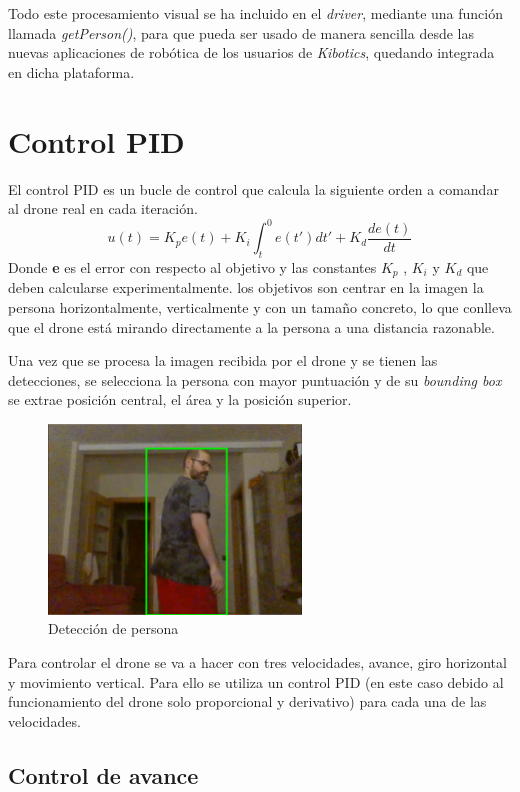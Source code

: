 Todo este procesamiento visual se ha incluido en el \textit{driver}, mediante una función llamada \textit{getPerson()}, para que pueda ser usado de manera sencilla desde las nuevas aplicaciones de robótica de los usuarios de \textit{Kibotics}, quedando integrada en dicha plataforma.

\section{Control PID}
El control PID es un bucle de control que calcula la siguiente orden a comandar al drone real en cada iteración.
\[ u(t) = K_p e(t) + K_i \int_{t}^{0} e(t') dt' + K_d \frac{de(t)}{dt}\]
Donde \textbf{e} es el error con respecto al objetivo y las  constantes $K_p$ , $K_i$ y $K_d$ que deben calcularse experimentalmente. los objetivos son centrar en la imagen la persona horizontalmente, verticalmente y con un tamaño concreto, lo que conlleva que el drone está mirando directamente a la persona a una distancia razonable.

Una vez que se procesa la imagen recibida por el drone y se tienen las detecciones, se selecciona la persona con mayor puntuación y de su \textit{bounding box} se extrae posición central, el área y la posición superior.

\begin{figure}[H]
  \begin{center}
    \includegraphics[width=0.6\textwidth]{figures/real/cap3.png}
		\caption{Detección de persona}
		\label{fig:bbox_ideal}
		\end{center}
\end{figure}

Para controlar el drone se va a hacer con tres velocidades, avance, giro horizontal y movimiento vertical. Para ello se utiliza un control PID (en este caso debido al funcionamiento del drone solo proporcional y derivativo) para cada una de las velocidades.
\subsection*{Control de avance}

